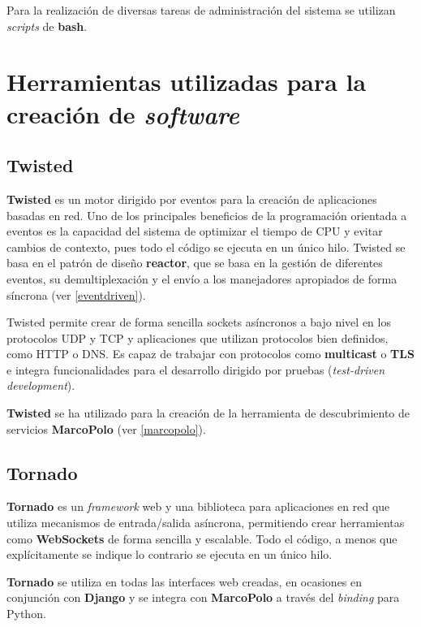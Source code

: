 Para la realización de diversas tareas de administración del sistema se utilizan \textit{scripts} de \textbf{bash}. 

\section{Herramientas utilizadas para la creación de \textit{software}}

\subsection{Twisted}

\textbf{Twisted}  es un motor dirigido por eventos para la creación de aplicaciones basadas en red. Uno de los principales beneficios de la programación orientada a eventos es la capacidad del sistema de optimizar el tiempo de CPU y evitar cambios de contexto, pues todo el código se ejecuta en un único hilo. Twisted se basa en el patrón de diseño \textbf{reactor}\cite{Coplien95reactor}, que se basa en la gestión de diferentes eventos, su demultiplexación y el envío a los manejadores apropiados de forma síncrona (ver \ref{eventdriven}).

Twisted permite crear de forma sencilla sockets asíncronos a bajo nivel en los protocolos UDP y TCP y aplicaciones que utilizan protocolos bien definidos, como HTTP o DNS. Es capaz de trabajar con protocolos como \textbf{multicast} o \textbf{TLS} e integra funcionalidades para el desarrollo dirigido por pruebas (\textit{test-driven development}).

\textbf{Twisted} se ha utilizado para la creación de la herramienta de descubrimiento de servicios \textbf{MarcoPolo} (ver \ref{marcopolo}).

\subsection{Tornado}

\textbf{Tornado} es un \textit{framework} web y una biblioteca para aplicaciones en red que utiliza mecanismos de entrada/salida asíncrona, permitiendo crear herramientas como \textbf{WebSockets} de forma sencilla y escalable. Todo el código, a menos que explícitamente se indique lo contrario se ejecuta en un único hilo.

\textbf{Tornado} se utiliza en todas las interfaces web creadas, en ocasiones en conjunción con \textbf{Django} y se integra con \textbf{MarcoPolo} a través del \textit{binding} para Python.

